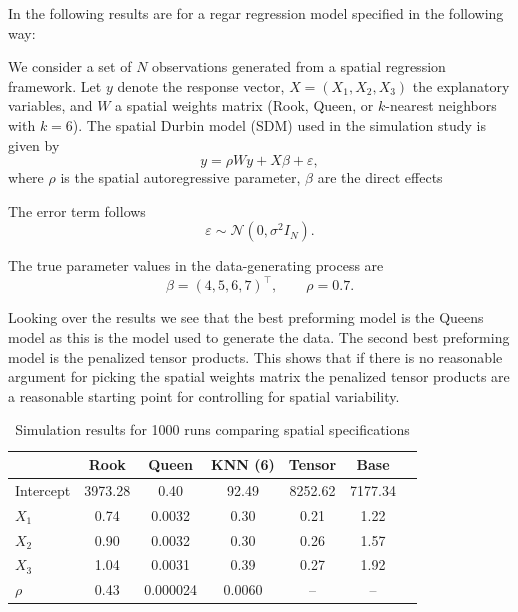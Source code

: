 
In the following results are for a regar regression model specified in the following way:

We consider a set of $N$ observations generated from a spatial regression
framework.  Let $y$ denote the response vector, $X = (X_1, X_2, X_3)$ the
explanatory variables, and $W$ a spatial weights matrix (Rook, Queen, or
$k$-nearest neighbors with $k=6$).  The spatial Durbin model (SDM) used in the
simulation study is given by
\begin{equation}
	y = \rho Wy + X\beta + \varepsilon,
	\label{eq:sdm}
\end{equation}
where $\rho$ is the spatial autoregressive parameter, $\beta$ are the direct effects

The error term follows
\[
	\varepsilon \sim \mathcal{N}(0, \sigma^2 I_N).
\]

The true parameter values in the data-generating process are
\[
	\beta = (4,5,6,7)^{\top}, \qquad \rho = 0.7.
\]

Looking over the results we see that the best preforming model is the Queens
model as this is the model used to generate the data. The second best preforming
model is the penalized tensor products. This shows that if there is no reasonable
argument for picking the spatial weights matrix the penalized tensor products are a
reasonable starting point for controlling for spatial variability.

\begin{table}[H]
	\centering
	\caption{Simulation results for 1000 runs comparing spatial specifications}
	\begin{tabular}{lcccccc}
		\hline
		 & \textbf{Rook} & \textbf{Queen} & \textbf{KNN (6)} & \textbf{Tensor} & \textbf{Base} \\
		\hline
		Intercept
		 & 3973.28
		 & 0.40
		 & 92.49
		 & 8252.62
		 & 7177.34                                                                             \\

		$X_1$
		 & 0.74
		 & 0.0032
		 & 0.30
		 & 0.21
		 & 1.22                                                                                \\

		$X_2$
		 & 0.90
		 & 0.0032
		 & 0.30
		 & 0.26
		 & 1.57                                                                                \\

		$X_3$
		 & 1.04
		 & 0.0031
		 & 0.39
		 & 0.27
		 & 1.92                                                                                \\

		$\rho$
		 & 0.43
		 & 0.000024
		 & 0.0060
		 & --
		 & --                                                                                  \\
		\hline
	\end{tabular}
\end{table}
